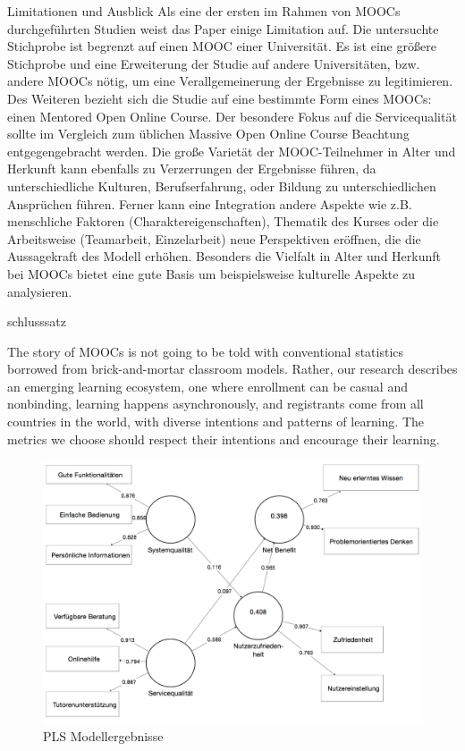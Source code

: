Limitationen und Ausblick
Als eine der ersten im Rahmen von MOOCs durchgeführten Studien weist das Paper einige Limitation auf. Die untersuchte Stichprobe ist begrenzt auf einen MOOC einer Universität. Es ist eine größere Stichprobe und eine Erweiterung der Studie auf andere Universitäten, bzw. andere MOOCs nötig, um eine Verallgemeinerung der Ergebnisse zu legitimieren. Des Weiteren bezieht sich die Studie auf eine bestimmte Form eines MOOCs: einen Mentored Open Online Course. Der besondere Fokus auf die Servicequalität sollte im Vergleich zum üblichen Massive Open Online Course Beachtung entgegengebracht werden. Die große Varietät der MOOC-Teilnehmer in Alter und Herkunft kann ebenfalls zu Verzerrungen der Ergebnisse führen, da unterschiedliche Kulturen, Berufserfahrung, oder Bildung zu unterschiedlichen Ansprüchen führen. 
Ferner kann eine Integration andere Aspekte wie z.B. menschliche Faktoren (Charaktereigenschaften), Thematik des Kurses oder die Arbeitsweise (Teamarbeit, Einzelarbeit) neue Perspektiven eröffnen, die die Aussagekraft des Modell erhöhen. Besonders die Vielfalt in Alter und Herkunft bei MOOCs bietet eine gute Basis um beispielsweise kulturelle Aspekte zu analysieren.  

schlusssatz

 

The story of MOOCs is not going to be told with conventional statistics borrowed from brick-and-mortar classroom models. Rather, our research describes an emerging learning ecosystem, one where enrollment can be casual and nonbinding, learning happens asynchronously, and registrants come from all countries in the world, with diverse intentions and patterns of learning. The metrics we choose should respect their intentions and encourage their learning.\parencite{reich2014tricky}


\begin{figure}[h]
\centering
\includegraphics[width=1\textwidth]{Grafiken/pls_bw_3.png}
\caption{PLS Modellergebnisse}
\label{PLS Modellergebnisse}
\end{figure}